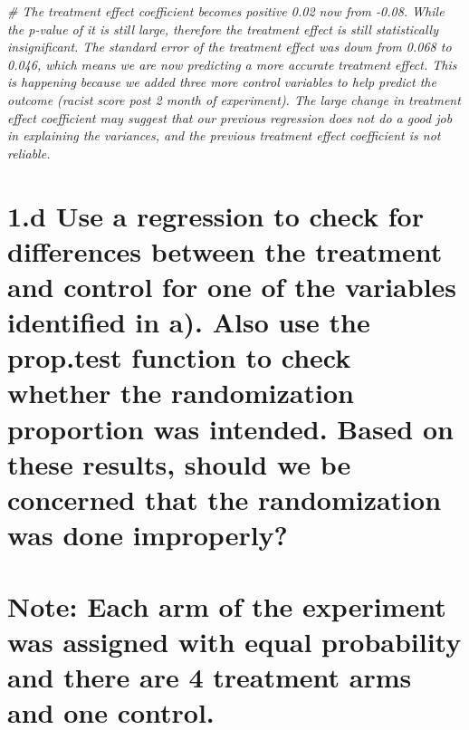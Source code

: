 \documentclass[
]{article}
\newenvironment{Shaded}{\begin{snugshade}}{\end{snugshade}}
\newcommand{\CommentTok}[1]{\textcolor[rgb]{0.56,0.35,0.01}{\textit{#1}}}
\begin{document}
\begin{Shaded}
\begin{Highlighting}[]
\CommentTok{\# The treatment effect coefficient becomes positive 0.02 now from {-}0.08. While the p{-}value of it is still large, therefore the treatment effect is still statistically insignificant. The standard error of the treatment effect was down from 0.068 to 0.046, which means we are now predicting a more accurate treatment effect. This is happening because we added three more control variables to help predict the outcome (racist score post 2 month of experiment). The large change in treatment effect coefficient may suggest that our previous regression does not do a good job in explaining the variances, and the previous treatment effect coefficient is not reliable. }
\end{Highlighting}
\end{Shaded}

\hypertarget{d-use-a-regression-to-check-for-differences-between-the-treatment-and-control-for-one-of-the-variables-identified-in-a.-also-use-the-prop.test-function-to-check-whether-the-randomization-proportion-was-intended.-based-on-these-results-should-we-be-concerned-that-the-randomization-was-done-improperly}{%
\section{1.d Use a regression to check for differences between the
treatment and control for one of the variables identified in a). Also
use the prop.test function to check whether the randomization proportion
was intended. Based on these results, should we be concerned that the
randomization was done
improperly?}\label{d-use-a-regression-to-check-for-differences-between-the-treatment-and-control-for-one-of-the-variables-identified-in-a.-also-use-the-prop.test-function-to-check-whether-the-randomization-proportion-was-intended.-based-on-these-results-should-we-be-concerned-that-the-randomization-was-done-improperly}}

\hypertarget{note-each-arm-of-the-experiment-was-assigned-with-equal-probability-and-there-are-4-treatment-arms-and-one-control.}{%
\section{Note: Each arm of the experiment was assigned with equal
probability and there are 4 treatment arms and one
control.}\label{note-each-arm-of-the-experiment-was-assigned-with-equal-probability-and-there-are-4-treatment-arms-and-one-control.}}
\end{document}
